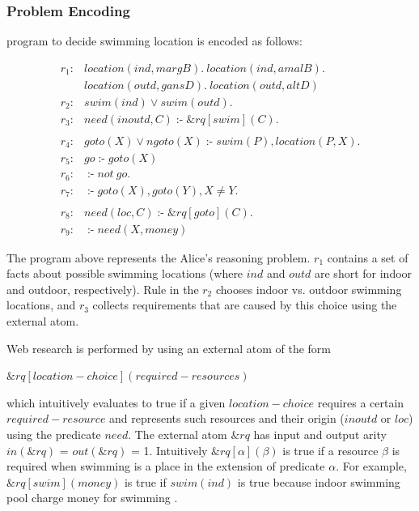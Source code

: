 \documentclass[14pt,a4paper, titlepage]{article}
\newcommand{\ext}[3]{\ensuremath{\&{#1}[#2](#3)}}
\DeclareMathOperator{\leftimpl}{:-}
\begin{document}
\subsubsection{Problem Encoding}
\hex{} program to decide swimming location is encoded as 
follows:
\begin{exmp}
\label{swimExample}
\begin{align*}
r_1\colon& location(ind, margB). \ location(ind, amalB). \ \\& 
location(outd, gansD). \ location(outd, altD) \\  
r_2\colon& swim(ind) \vee swim(outd).\\ 
r_3\colon& need(inoutd, C) \leftimpl \ext{\mathit{rq}}
{\mathit{swim}}{\mathit{C}}. \\
\\
r_4\colon& goto(X) \vee ngoto(X) \leftimpl swim(P), 
location(P, X).\\
r_5\colon& go \leftimpl goto(X)\\
r_6\colon& \leftimpl not \ go. \\
r_7\colon& \leftimpl goto(X), goto(Y), X \neq Y. \\
\\
r_8\colon& \mathit{need}(loc, C) \leftimpl 
\ext{\mathit{rq}}{\mathit{goto}}{\mathit{C}}. \\ 
r_9\colon& \leftimpl need(X, money)
\end{align*}
\end{exmp}
The \hex{} program above represents the Alice's reasoning 
problem. $r_1$ contains a set of facts about possible 
swimming locations (where $\mathit{ind}$ and 
$\mathit{outd}$ are short for indoor and outdoor, 
respectively). Rule in the $r_2$ chooses indoor vs. outdoor 
swimming locations, and $r_3$ collects requirements that 
are caused by this choice using the external atom. 

Web research is performed by using an external atom of the 
form\\ \centerline{$\ext{\mathit{rq}}{\mathit{location-
choice}}{\mathit{required-resources}}$} which intuitively 
evaluates to true if a given $\mathit{location-choice}$ 
requires a certain $\mathit{required-resource}$ and 
represents such resources  and their origin 
($\mathit{inoutd}$ or $\mathit{loc}$) using the predicate 
$\mathit{need}$. The external atom $\mathit{\&rq}$ has 
input and output arity $\mathit{in(\&rq)}$ = 
$\mathit{out(\&rq)}$ = 1. Intuitively  $\ext{\mathit{rq}}
{\mathit{\alpha}}{\mathit{\beta}}$ is true if a resource 
$\beta$ is required when swimming is a place in the 
extension of predicate $\alpha$. For example, 
$\ext{\mathit{rq}}{\mathit{swim}}{\mathit{money}}$ is true 
if $\mathit{swim(ind)}$ is true because indoor swimming 
pool charge money for swimming \cite{swim}. 
\end{document}
